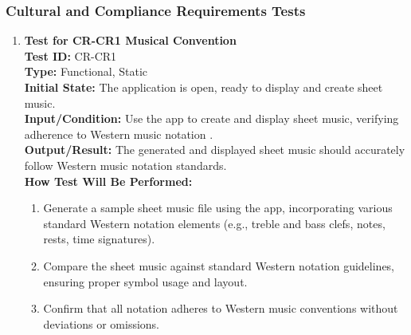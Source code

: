 \documentclass[12pt, titlepage]{article}
\begin{document}
\subsubsection{Cultural and Compliance Requirements Tests}
\begin{enumerate}
    \item \textbf{Test for CR-CR1 Musical Convention} \\
      \newline
      \textbf{Test ID:} CR-CR1 \\
      \textbf{Type:} Functional, Static \\
      \textbf{Initial State:} The application is open, ready to display and create sheet music. \\
      \textbf{Input/Condition:} Use the app to create and display sheet music, verifying adherence to Western music notation \cite{music-notation}. \\
      \textbf{Output/Result:} The generated and displayed sheet music should accurately follow Western music notation standards. \\
      \textbf{How Test Will Be Performed:}
      \begin{enumerate}
          \item Generate a sample sheet music file using the app, incorporating various standard Western notation elements (e.g., treble and bass clefs, notes, rests, time signatures).
          \item Compare the sheet music against standard Western notation guidelines, ensuring proper symbol usage and layout.
          \item Confirm that all notation adheres to Western music conventions without deviations or omissions.
      \end{enumerate}


\end{enumerate}
\end{document}
